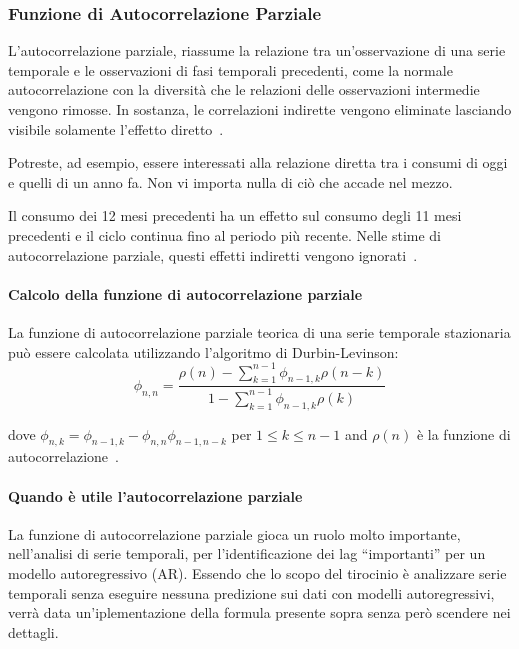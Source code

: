 \subsubsection{Funzione di Autocorrelazione Parziale}
L'autocorrelazione parziale, riassume la relazione tra 
un'osservazione di una serie temporale e le osservazioni di fasi temporali precedenti,
come la normale autocorrelazione con la diversità che le relazioni 
delle osservazioni intermedie vengono rimosse. In sostanza, 
le correlazioni indirette vengono eliminate lasciando visibile solamente
l'effetto diretto~\cite{md:mediumacf_pacf}.

Potreste, ad esempio, essere interessati alla relazione diretta tra i consumi 
di oggi e quelli di un anno fa. Non vi importa nulla di ciò che accade nel mezzo.

Il consumo dei 12 mesi precedenti ha un effetto sul consumo degli 11 mesi precedenti 
e il ciclo continua fino al periodo più recente. Nelle stime di autocorrelazione parziale, 
questi effetti indiretti vengono ignorati~\cite{ain:acf_pacf}.

\paragraph{Calcolo della funzione di autocorrelazione parziale}
La funzione di autocorrelazione parziale teorica di una serie temporale 
stazionaria può essere calcolata utilizzando l'algoritmo di Durbin-Levinson:
\[ \phi_{n,n} = 
\frac
{\rho(n) - \sum_{k = 1}^{n-1}  \phi_{n-1,k}\rho(n-k)}
{1 - \sum_{k = 1}^{n-1} \phi_{n-1,k}\rho(k)} 
\]
    
dove $\phi_{n,k} = \phi_{n-1,k} - \phi_{n,n}\phi_{n-1,n-k}$ per $1 \leq k \leq n-1$ and
$\rho(n)$ è la funzione di autocorrelazione~\cite{wiki:pacf}.

\paragraph{Quando è utile l'autocorrelazione parziale}
La funzione di autocorrelazione parziale gioca un ruolo molto importante, nell'analisi
di serie temporali, per l'identificazione dei lag ``importanti'' per un modello autoregressivo
(AR). Essendo che lo scopo del tirocinio è analizzare 
serie temporali senza eseguire nessuna predizione sui dati con modelli autoregressivi, verrà
data un'iplementazione della formula presente sopra senza però scendere nei dettagli. 

